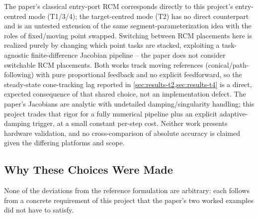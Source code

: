 \documentclass[11pt,a4paper]{article}
\begin{document}
The paper's classical entry-port RCM corresponds directly to this project's entry-centred mode (T1/3/4); the target-centred mode (T2) has no direct counterpart and is an untested extension of the same segment-parameterization idea with the roles of fixed/moving point swapped. Switching between RCM placements here is realized purely by changing which point tasks are stacked, exploiting a task-agnostic finite-difference Jacobian pipeline -- the paper does not consider switchable RCM placements. Both works track moving references (conical/path-following) with pure proportional feedback and no explicit feedforward, so the steady-state cone-tracking lag reported in \cref{sec:results-t2,sec:results-t4} is a direct, expected consequence of that shared choice, not an implementation defect. The paper's Jacobians are analytic with undetailed damping/singularity handling; this project trades that rigor for a fully numerical pipeline plus an explicit adaptive-damping trigger, at a small constant per-step cost. Neither work presents hardware validation, and no cross-comparison of absolute accuracy is claimed given the differing platforms and scope.

\subsection{Why These Choices Were Made}
\label{sec:comparison-rationale}

None of the deviations from the reference formulation are arbitrary: each follows from a concrete requirement of this project that the paper's two worked examples did not have to satisfy.
\end{document}
